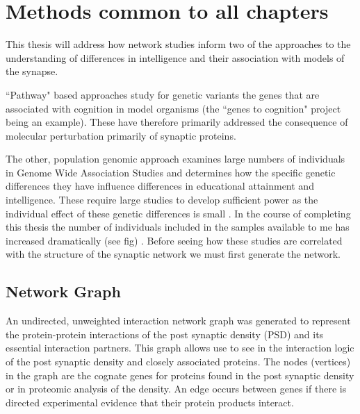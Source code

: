 \chapter{Methods common to all chapters}



This thesis will address how network studies inform two of the approaches to the understanding of differences in intelligence and their association with models of the synapse.





``Pathway" based approaches study for genetic variants the genes that are associated with cognition in model organisms \cite{deary2009genetic} (the ``genes to cognition" project being an example). These have therefore primarily addressed the consequence of molecular perturbation primarily of synaptic proteins. 

The other, population genomic approach examines large numbers of individuals in Genome Wide Association Studies and determines how the specific genetic differences they have influence differences in educational attainment and intelligence. These require large studies to develop sufficient power as the individual effect of these genetic differences is small \cite{plomin2015genetics}. In the course of completing this thesis the number of individuals included in the samples  available to me has increased dramatically (see fig) . Before seeing how these studies are correlated with the structure of the synaptic network we must first generate the network. 


\section{Network Graph}
\label{sec:network graph generation}

An undirected, unweighted interaction network graph was generated to represent the protein-protein interactions of the post synaptic density (PSD) and its essential interaction partners. This graph allows use to see in the interaction logic of the post synaptic density and closely associated proteins. The nodes (vertices) in the graph are the cognate genes for proteins found in the post synaptic density or in proteomic analysis of the density. An edge occurs between genes if there is directed experimental evidence that their protein products interact. 




